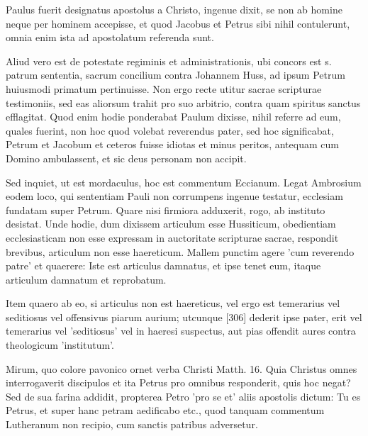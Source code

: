 Paulus fuerit designatus apostolus a Christo, ingenue dixit, se non ab homine neque per hominem accepisse, et quod Jacobus et Petrus sibi nihil contulerunt, omnia enim ista ad apostolatum referenda sunt.

Aliud vero est de potestate regiminis et administrationis, ubi concors est s. patrum sententia, sacrum concilium contra Johannem Huss, ad ipsum Petrum huiusmodi primatum pertinuisse. Non ergo recte utitur sacrae scripturae testimoniis, sed eas aliorsum trahit pro suo arbitrio, contra quam spiritus sanctus efflagitat. Quod enim hodie ponderabat Paulum dixisse, nihil referre ad eum, quales fuerint, non hoc quod volebat reverendus pater, sed hoc significabat, Petrum et Jacobum et ceteros fuisse idiotas et minus peritos, antequam cum Domino ambulassent, et sic deus personam non accipit.

Sed inquiet, ut est mordaculus, hoc est commentum Eccianum. Legat Ambrosium eodem loco, qui sententiam Pauli non corrumpens ingenue testatur, ecclesiam fundatam super Petrum. Quare nisi firmiora adduxerit, rogo, ab instituto desistat. Unde hodie, dum dixissem articulum esse Hussiticum, obedientiam ecclesiasticam non esse expressam in auctoritate scripturae sacrae, respondit brevibus, articulum non esse haereticum. Mallem punctim agere 'cum reverendo patre' et quaerere: Iste est articulus damnatus, et ipse tenet eum, itaque articulum damnatum et reprobatum.

Item quaero ab eo, si articulus non est haereticus, vel ergo est temerarius vel seditiosus vel offensivus piarum aurium; utcunque [306] dederit ipse pater, erit vel temerarius vel 'seditiosus' vel in haeresi suspectus, aut pias offendit aures contra theologicum 'institutum'.

Mirum, quo colore pavonico ornet verba Christi Matth. 16. Quia Christus omnes interrogaverit discipulos et ita Petrus pro omnibus responderit, quis hoc negat? Sed de sua farina addidit, propterea Petro 'pro se et' aliis apostolis dictum: Tu es Petrus, et super hanc petram aedificabo etc., quod tanquam commentum Lutheranum non recipio, cum sanctis patribus adversetur.

